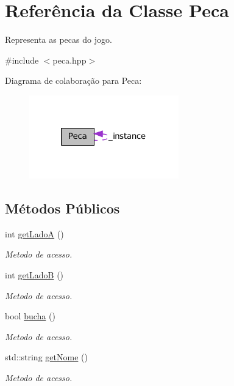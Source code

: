 \hypertarget{classPeca}{
\section{Referência da Classe Peca}
\label{classPeca}
}


Representa as pecas do jogo.  




{\ttfamily \#include $<$peca.hpp$>$}



Diagrama de colaboração para Peca:\nopagebreak
\begin{figure}[H]
\begin{center}
\leavevmode
\includegraphics[width=184pt]{classPeca__coll__graph}
\end{center}
\end{figure}
\subsection*{Métodos Públicos}
\begin{DoxyCompactItemize}
\item 
int \hyperlink{classPeca_ac4cdffabf0200c1afdd295e61174c824}{getLadoA} ()
\begin{DoxyCompactList}\small\item\em Metodo de acesso. \item\end{DoxyCompactList}\item 
int \hyperlink{classPeca_a3d5c0c01298e00552d525dad307c9438}{getLadoB} ()
\begin{DoxyCompactList}\small\item\em Metodo de acesso. \item\end{DoxyCompactList}\item 
bool \hyperlink{classPeca_a0e206bb71b79bda0f4afc3cc2a3cdd89}{bucha} ()
\begin{DoxyCompactList}\small\item\em Metodo de acesso. \item\end{DoxyCompactList}\item 
std::string \hyperlink{classPeca_aebeb13e1a53f511cf9a21b2505b66d34}{getNome} ()
\begin{DoxyCompactList}\small\item\em Metodo de acesso. \item\end{DoxyCompactList}\end{DoxyCompactItemize}

